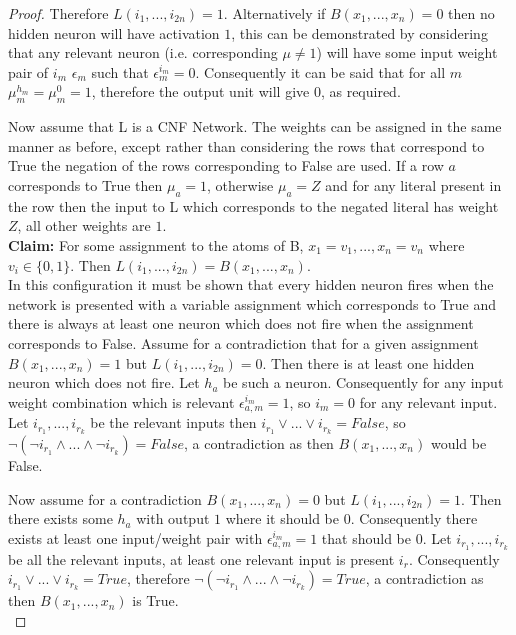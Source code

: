 \begin{proof}
Therefore $L(i_1, ..., i_{2n}) = 1$. Alternatively if $B(x_1, ..., x_n) = 0$ then no hidden neuron will have activation $1$, this can be demonstrated by considering that any relevant neuron (i.e. corresponding $\mu \neq 1$) will have some input weight pair of $i_m$ $\epsilon_m$ such that $\epsilon_m^{i_m} = 0$. Consequently it can be said that for all $m$ $\mu_m^{h_m} = \mu_m^{0} = 1$, therefore the output unit will give $0$, as required.

Now assume that L is a CNF Network. The weights can be assigned in the same manner as before, except rather than considering the rows that correspond to True the negation of the rows corresponding to False are used. If a row $a$ corresponds to True then $\mu_a = 1$, otherwise $\mu_a = Z$ and for any literal present in the row then the input to L which corresponds to the negated literal has weight $Z$, all other weights are $1$.\\

\textbf{Claim:} For some assignment to the atoms of B, $x_1 = v_1, ..., x_n = v_n$ where $v_i \in \{0, 1\}$. Then $L(i_1, ..., i_{2n}) = B(x_1, ..., x_n)$.\\

In this configuration it must be shown that every hidden neuron fires when the network is presented with a variable assignment which corresponds to True and there is always at least one neuron which does not fire when the assignment corresponds to False. Assume for a contradiction that for a given assignment $B(x_1, ..., x_n) = 1$ but $L(i_1, ..., i_{2n}) = 0$. Then there is at least one hidden neuron which does not fire. Let $h_a$ be such a neuron. Consequently for any input weight combination which is relevant $\epsilon_{a,m}^{i_m} = 1$, so $i_m = 0$ for any relevant input. Let $i_{r_1}, ..., i_{r_k}$ be the relevant inputs then $i_{r_1} \lor ... \lor i_{r_k} = False$, so $\lnot(\lnot i_{r_1} \land ... \land \lnot i_{r_k}) = False$, a contradiction as then $B(x_1, ..., x_n)$ would be False.

Now assume for a contradiction $B(x_1, ..., x_n) = 0$ but $L(i_1, ..., i_{2n}) = 1$. Then there exists some $h_a$ with output $1$ where it should be $0$. Consequently there exists at least one input/weight pair with $\epsilon_{a,m}^{i_m} = 1$ that should be $0$. Let $i_{r_1}, ..., i_{r_k}$ be all the relevant inputs, at least one relevant input is present $i_r$. Consequently $i_{r_1} \lor ... \lor i_{r_k} = True$, therefore $\lnot(\lnot i_{r_1} \land ... \land \lnot i_{r_k}) = True$, a contradiction as then $B(x_1, ..., x_n)$ is True.\\
\end{proof}

